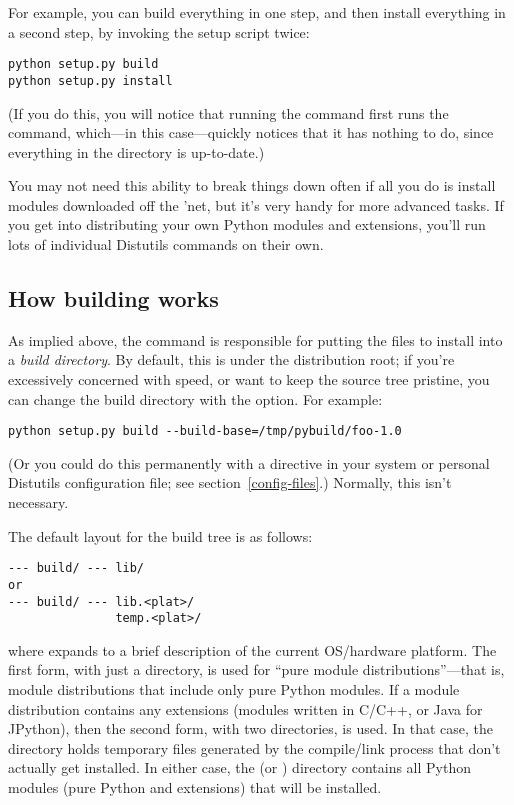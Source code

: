 \documentclass{howto}
\begin{document}
For example, you can build everything in one step, and then install
everything in a second step, by invoking the setup script twice:
\begin{verbatim}
python setup.py build
python setup.py install
\end{verbatim}
(If you do this, you will notice that running the 
command first runs the  command, which---in this
case---quickly notices that it has nothing to do, since everything in
the  directory is up-to-date.)

You may not need this ability to break things down often if all you do
is install modules downloaded off the 'net, but it's very handy for more
advanced tasks.  If you get into distributing your own Python modules
and extensions, you'll run lots of individual Distutils commands on
their own.


\subsection{How building works}

As implied above, the  command is responsible for putting
the files to install into a \emph{build directory}.  By default, this is
 under the distribution root; if you're excessively
concerned with speed, or want to keep the source tree pristine, you can
change the build directory with the  option.
For example:
\begin{verbatim}
python setup.py build --build-base=/tmp/pybuild/foo-1.0
\end{verbatim}
(Or you could do this permanently with a directive in your system or
personal Distutils configuration file; see
section~\ref{config-files}.)  Normally, this isn't necessary.

The default layout for the build tree is as follows:
\begin{verbatim}
--- build/ --- lib/
or
--- build/ --- lib.<plat>/
               temp.<plat>/
\end{verbatim}
where  expands to a brief description of the current
OS/hardware platform.  The first form, with just a  directory,
is used for ``pure module distributions''---that is, module
distributions that include only pure Python modules.  If a module
distribution contains any extensions (modules written in C/C++, or Java
for JPython), then the second form, with two  directories,
is used.  In that case, the  directory holds
temporary files generated by the compile/link process that don't
actually get installed.  In either case, the  (or
) directory contains all Python modules (pure
Python and extensions) that will be installed.
\end{document}
